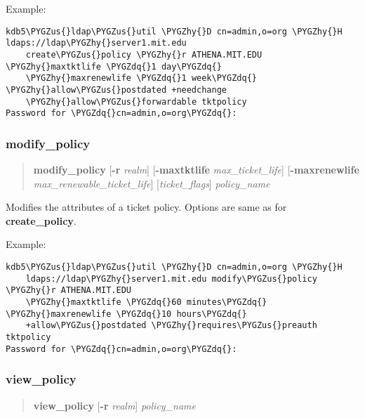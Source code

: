 \documentclass[letterpaper,10pt,english]{sphinxmanual}
\def\PYGZus{\char`\_}
\def\PYGZhy{\char`\-}
\def\PYGZdq{\char`\"}
\begin{document}
Example:

\begin{Verbatim}[commandchars=\\\{\}]
kdb5\PYGZus{}ldap\PYGZus{}util \PYGZhy{}D cn=admin,o=org \PYGZhy{}H ldaps://ldap\PYGZhy{}server1.mit.edu
    create\PYGZus{}policy \PYGZhy{}r ATHENA.MIT.EDU \PYGZhy{}maxtktlife \PYGZdq{}1 day\PYGZdq{}
    \PYGZhy{}maxrenewlife \PYGZdq{}1 week\PYGZdq{} \PYGZhy{}allow\PYGZus{}postdated +needchange
    \PYGZhy{}allow\PYGZus{}forwardable tktpolicy
Password for \PYGZdq{}cn=admin,o=org\PYGZdq{}:
\end{Verbatim}


\subsubsection{modify\_policy}
\label{admin/admin_commands/kdb5_ldap_util:modify-policy}\label{admin/admin_commands/kdb5_ldap_util:kdb5-ldap-util-create-policy-end}\label{admin/admin_commands/kdb5_ldap_util:kdb5-ldap-util-modify-policy}\begin{quote}

\textbf{modify\_policy}
{[}\textbf{-r} \emph{realm}{]}
{[}\textbf{-maxtktlife} \emph{max\_ticket\_life}{]}
{[}\textbf{-maxrenewlife} \emph{max\_renewable\_ticket\_life}{]}
{[}\emph{ticket\_flags}{]}
\emph{policy\_name}
\end{quote}

Modifies the attributes of a ticket policy.  Options are same as for
\textbf{create\_policy}.

Example:

\begin{Verbatim}[commandchars=\\\{\}]
kdb5\PYGZus{}ldap\PYGZus{}util \PYGZhy{}D cn=admin,o=org \PYGZhy{}H
    ldaps://ldap\PYGZhy{}server1.mit.edu modify\PYGZus{}policy \PYGZhy{}r ATHENA.MIT.EDU
    \PYGZhy{}maxtktlife \PYGZdq{}60 minutes\PYGZdq{} \PYGZhy{}maxrenewlife \PYGZdq{}10 hours\PYGZdq{}
    +allow\PYGZus{}postdated \PYGZhy{}requires\PYGZus{}preauth tktpolicy
Password for \PYGZdq{}cn=admin,o=org\PYGZdq{}:
\end{Verbatim}


\subsubsection{view\_policy}
\label{admin/admin_commands/kdb5_ldap_util:view-policy}\label{admin/admin_commands/kdb5_ldap_util:kdb5-ldap-util-modify-policy-end}\label{admin/admin_commands/kdb5_ldap_util:kdb5-ldap-util-view-policy}\begin{quote}

\textbf{view\_policy}
{[}\textbf{-r} \emph{realm}{]}
\emph{policy\_name}
\end{quote}
\end{document}
